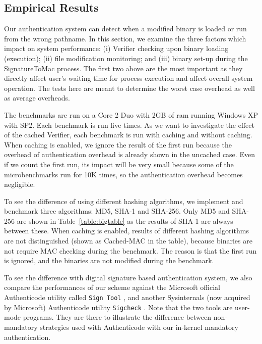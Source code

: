 \subsection{Empirical Results}
\label{sec:binauth-cost}

Our authentication system can detect when a modified binary is loaded
or run from the wrong pathname. In this section, we examine
the three factors which impact on system performance:
(i) Verifier checking upon binary loading (execution);
(ii) file modification monitoring; and
(iii) binary set-up during the SignatureToMac process.
The first two above are the most important as they directly 
affect user's waiting time for process execution and 
affect overall system operation.
The tests here are meant to determine the worst case overhead as well
as average overheads.

The benchmarks are run on a Core 2 Duo with 2GB of ram
running Windows XP with SP2.
Each benchmark is run five times.
As we want to investigate the effect of the cached Verifier,
each benchmark is run with caching and without caching.
When caching is enabled, we ignore the result of the first run because
the overhead of authentication overhead is already shown in the uncached case.
Even if we count the first run, its impact will be very small because
some of the microbenchmarks run for 10K times, so the authentication
overhead becomes negligible.

To see the difference of using different hashing algorithms, we implement
and benchmark three algorithms: MD5, SHA-1 and SHA-256.
Only MD5 and SHA-256 are shown in Table~\ref{table:bigtable} as
the results of SHA-1 are always between these.
When caching is enabled, results of different hashing algorithms are
not distinguished (shown as Cached-MAC in the table),
because binaries are not require MAC checking during the benchmark.
The reason is that the first run is ignored, and the binaries are not modified
during the benchmark.

To see the difference with digital signature based authentication system,
we also compare the performances of our scheme against
the Microsoft official Authenticode utility called {\tt Sign Tool} \cite{signtool},
and another Sysinternals (now acquired by Microsoft) Authenticode utility
{\tt Sigcheck} \cite{sigcheck}.
Note that the two tools are user-mode programs.
They are there to illustrate the difference between non-mandatory strategies
used with Authenticode with our in-kernel mandatory authentication.

